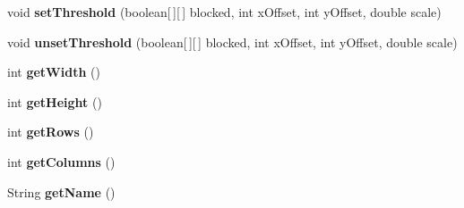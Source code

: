 \begin{DoxyCompactItemize}
\item 
\hypertarget{classdev_1_1boxy_1_1fortyfive_1_1core_1_1image_1_1_image_grid_a85741e6f5fbaacd53156b390a7953898}{
void {\bfseries setThreshold} (boolean\mbox{[}$\,$\mbox{]}\mbox{[}$\,$\mbox{]} blocked, int xOffset, int yOffset, double scale)}
\label{d1/d3a/classdev_1_1boxy_1_1fortyfive_1_1core_1_1image_1_1_image_grid_a85741e6f5fbaacd53156b390a7953898}

\item 
\hypertarget{classdev_1_1boxy_1_1fortyfive_1_1core_1_1image_1_1_image_grid_ace0b9406b44a56dbee21ff1903fe1c93}{
void {\bfseries unsetThreshold} (boolean\mbox{[}$\,$\mbox{]}\mbox{[}$\,$\mbox{]} blocked, int xOffset, int yOffset, double scale)}
\label{d1/d3a/classdev_1_1boxy_1_1fortyfive_1_1core_1_1image_1_1_image_grid_ace0b9406b44a56dbee21ff1903fe1c93}

\item 
\hypertarget{classdev_1_1boxy_1_1fortyfive_1_1core_1_1image_1_1_image_grid_a6957c78fd7fc74c1e4d7538464098140}{
int {\bfseries getWidth} ()}
\label{d1/d3a/classdev_1_1boxy_1_1fortyfive_1_1core_1_1image_1_1_image_grid_a6957c78fd7fc74c1e4d7538464098140}

\item 
\hypertarget{classdev_1_1boxy_1_1fortyfive_1_1core_1_1image_1_1_image_grid_a2cd7580f631b828d99dcdebc5366d495}{
int {\bfseries getHeight} ()}
\label{d1/d3a/classdev_1_1boxy_1_1fortyfive_1_1core_1_1image_1_1_image_grid_a2cd7580f631b828d99dcdebc5366d495}

\item 
\hypertarget{classdev_1_1boxy_1_1fortyfive_1_1core_1_1image_1_1_image_grid_a78a58bf46e5d5a9439f070f777027178}{
int {\bfseries getRows} ()}
\label{d1/d3a/classdev_1_1boxy_1_1fortyfive_1_1core_1_1image_1_1_image_grid_a78a58bf46e5d5a9439f070f777027178}

\item 
\hypertarget{classdev_1_1boxy_1_1fortyfive_1_1core_1_1image_1_1_image_grid_afea60c43a3ced4ce56f1f22273af020c}{
int {\bfseries getColumns} ()}
\label{d1/d3a/classdev_1_1boxy_1_1fortyfive_1_1core_1_1image_1_1_image_grid_afea60c43a3ced4ce56f1f22273af020c}

\item 
\hypertarget{classdev_1_1boxy_1_1fortyfive_1_1core_1_1image_1_1_image_grid_a4afa058ddca22c3186a6513e5a2f0ec0}{
String {\bfseries getName} ()}
\label{d1/d3a/classdev_1_1boxy_1_1fortyfive_1_1core_1_1image_1_1_image_grid_a4afa058ddca22c3186a6513e5a2f0ec0}

\end{DoxyCompactItemize}
